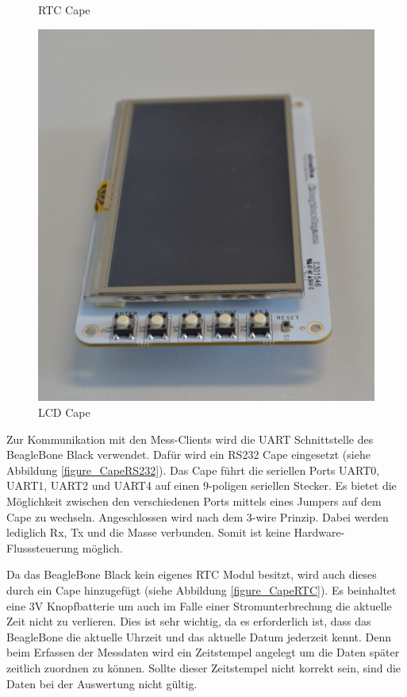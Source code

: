 \begin{figure}[H]
  \caption{RTC Cape}\label{figure_CapeRTC}
\endminipage\hfill
{}%
  \includegraphics[width=\linewidth]{img/general/CapeLCD.png}
  \caption{LCD Cape}\label{figure_CapeLCD}
\endminipage
\end{figure}


Zur Kommunikation mit den Mess-Clients wird die \ac{UART} Schnittstelle des BeagleBone Black verwendet. Dafür wird ein RS232 Cape eingesetzt (siehe Abbildung \ref{figure_CapeRS232}). Das Cape führt die seriellen Ports UART0, UART1, UART2 und UART4 auf einen 9-poligen seriellen Stecker. Es bietet die Möglichkeit zwischen den verschiedenen Ports mittels eines Jumpers auf dem Cape zu wechseln. Angeschlossen wird nach dem 3-wire Prinzip. Dabei werden lediglich Rx, Tx und die Masse verbunden. Somit ist keine Hardware-Flusssteuerung möglich.\ 

Da das BeagleBone Black kein eigenes \ac{RTC} Modul besitzt, wird auch dieses durch ein Cape hinzugefügt (siehe Abbildung \ref{figure_CapeRTC}). Es beinhaltet eine 3V Knopfbatterie um auch im Falle einer Stromunterbrechung die aktuelle Zeit nicht zu verlieren. Dies ist sehr wichtig, da es erforderlich ist, dass das BeagleBone die aktuelle Uhrzeit und das aktuelle Datum jederzeit kennt. Denn beim Erfassen der Messdaten wird ein Zeitstempel angelegt um die Daten später zeitlich zuordnen zu können. Sollte dieser Zeitstempel nicht korrekt sein, sind die Daten bei der Auswertung nicht gültig.\ 

